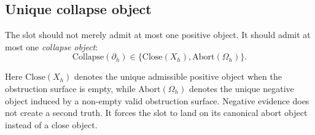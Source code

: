\documentclass[11pt]{article}
\newcommand{\term}[1]{\textit{#1}}
\begin{document}
\subsection{Unique collapse object}

The slot should not merely admit at most one positive object. It should admit
at most one \term{collapse object}:
\[
\mathrm{Collapse}(\partial_h) \in \{\mathrm{Close}(X_h), \mathrm{Abort}(\Omega_h)\}.
\]

Here \(\mathrm{Close}(X_h)\) denotes the unique admissible positive object when
the obstruction surface is empty, while \(\mathrm{Abort}(\Omega_h)\) denotes
the unique negative object induced by a non-empty valid obstruction surface.
Negative evidence does not create a second truth. It forces the slot to land on
its canonical abort object instead of a close object.
\end{document}
